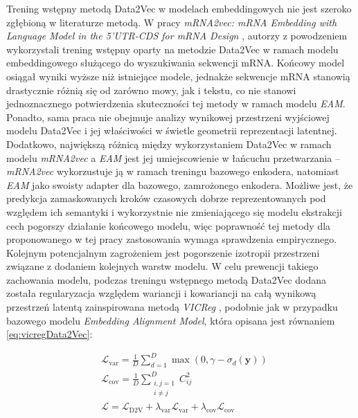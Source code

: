 Trening wstępny metodą Data2Vec w modelach embeddingowych nie jest szeroko zgłębioną w literaturze metodą. W pracy \textit{mRNA2vec: mRNA Embedding with Language Model in the 5'UTR-CDS for mRNA Design} \cite{mrna2vec}, autorzy z powodzeniem wykorzystali trening wstępny oparty na metodzie Data2Vec w ramach modelu embeddingowego służącego do wyszukiwania sekwencji mRNA. Końcowy model osiągał wyniki wyższe niż istniejące modele, jednakże sekwencje mRNA stanowią drastycznie różnią się od zarówno mowy, jak i tekstu, co nie stanowi jednoznacznego potwierdzenia skuteczności tej metody w ramach modelu \textit{EAM}. Ponadto, sama praca nie obejmuje analizy wynikowej przestrzeni wyjściowej modelu Data2Vec i jej właściwości w świetle geometrii reprezentacji latentnej. Dodatkowo, największą różnicą między wykorzystaniem Data2Vec w ramach modelu \textit{mRNA2vec} a \textit{EAM} jest jej umiejscowienie w łańcuchu przetwarzania -- \textit{mRNA2vec} wykorzustuje ją w ramach treningu bazowego enkodera, natomiast \textit{EAM} jako swoisty adapter dla bazowego, zamrożonego enkodera. Możliwe jest, że predykcja zamaskowanych kroków czasowych dobrze reprezentowanych pod względem ich semantyki i wykorzystnie nie zmieniającego się modelu ekstrakcji cech pogorszy działanie końcowego modelu, więc poprawność tej metody dla proponowanego w tej pracy zastosowania wymaga sprawdzenia empirycznego. Kolejnym potencjalnym zagrożeniem jest pogorszenie izotropii przestrzeni związane z dodaniem kolejnych warstw modelu. W celu prewencji takiego zachowania modelu, podczas treningu wstępnego metodą Data2Vec dodana została regularyzacja względem wariancji i kowariancji na całą wynikową przestrzeń latentą zainspirowana metodą \textit{VICReg} \cite{bardes2022vicreg}, podobnie jak w przypadku bazowego modelu \textit{Embedding Alignment Model}, która opisana jest równaniem \eqref{eq:vicregData2Vec}:

\begin{equation}
\begin{aligned}
&\mathcal{L}_{\mathrm{var}} = \frac{1}{D} \sum_{d=1}^{D} \max(0, \gamma - \sigma_d(\mathbf{y})) \\
&\mathcal{L}_{\mathrm{cov}} = \frac{1}{D} \sum_{\substack{i,j=1 \\ i\neq j}}^{D} C_{ij}^{2} \\
&\mathcal{L} = \mathcal{L}_{\mathrm{D2V}} + \lambda_{\mathrm{var}}\mathcal{L}_{\mathrm{var}} + \lambda_{\mathrm{cov}}\mathcal{L}_{\mathrm{cov}}
\end{aligned}
\label{eq:vicregData2Vec}
\end{equation}

